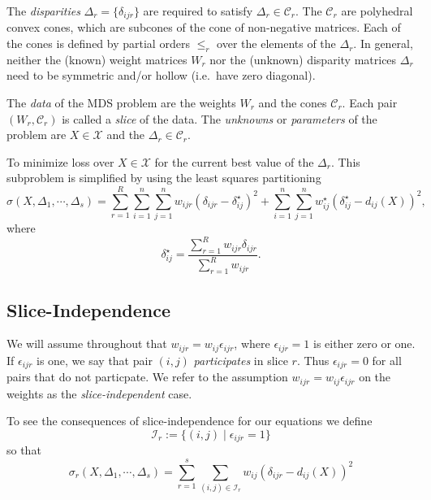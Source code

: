 \documentclass[
  12pt,
]{article}
\begin{document}
The \emph{disparities} \(\Delta_r=\{\delta_{ijr}\}\) are required to satisfy \(\Delta_r\in\mathcal{C}_r\). The \(\mathcal{C}_r\) are polyhedral convex cones, which are subcones of the cone of non-negative matrices. Each of the cones is defined by partial orders \(\leq_r\) over the elements of the \(\Delta_r\). In general, neither the (known) weight matrices \(W_r\) nor the (unknown) disparity matrices \(\Delta_r\) need to be symmetric and/or hollow (i.e.~have zero diagonal).

The \emph{data} of the MDS problem are the weights \(W_r\) and the cones \(\mathcal{C}_r\). Each pair \((W_r,\mathcal{C}_r)\) is called a \emph{slice} of the data. The \emph{unknowns} or \emph{parameters} of the problem are \(X\in\mathcal{X}\) and the \(\Delta_r\in\mathcal{C}_r\).

To minimize loss over \(X\in\mathcal{X}\) for the current best value of the \(\Delta_r\). This subproblem is simplified by using the least squares partitioning
\begin{equation}
\sigma(X,\Delta_1,\cdots,\Delta_s)=\sum_{r=1}^R\sum_{i=1}^n\sum_{j=1}^nw_{ijr}(\delta_{ijr}-\delta_{ij}^\star)^2+\sum_{i=1}^n\sum_{j=1}^nw_{ij}^\star(\delta_{ij}^\star-d_{ij}(X))^2,
\label{eq:stresspart}
\end{equation}
where
\begin{equation}
\delta_{ij}^\star=\frac{\sum_{r=1}^R w_{ijr}\delta_{ijr}}{\sum_{r=1}^R w_{ijr}}.
\label{eq:deltastardef}
\end{equation}

\subsection{Slice-Independence}\label{slice-independence}

We will assume throughout that \(w_{ijr}=w_{ij}\epsilon_{ijr}\), where
\(\epsilon_{ijr}=1\) is either zero or one. If \(\epsilon_{ijr}\) is one, we say that pair \((i,j)\) \emph{participates} in slice \(r\). Thus \(\epsilon_{ijr}=0\) for all pairs that do not particpate. We refer to the assumption \(w_{ijr}=w_{ij}\epsilon_{ijr}\) on the weights as the \emph{slice-independent} case.

To see the consequences of slice-independence for our equations
we define
\begin{equation}
\mathcal{I}_r:=\{(i, j)\mid \epsilon_{ijr}= 1\}
\label{eq:irdef}
\end{equation}
so that
\begin{equation}
\sigma_r(X,\Delta_1,\cdots,\Delta_s)=\sum_{r=1}^s\sum_{(i,j)\in\mathcal{I}_r} w_{ij}(\delta_{ijr}-d_{ij}(X))^2
\label{eq:stressdefred}
\end{equation}
\end{document}
